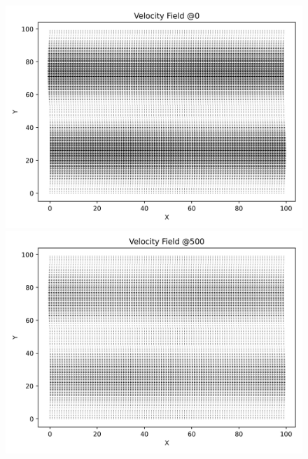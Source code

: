 \begin{figure}[H]
    \begin{minipage}{0.33\textwidth}
        \includegraphics[width=\linewidth]{graphs/ShearWaveDecay/VelocityDistribution/velocity_field_0}
    \end{minipage}%
    \begin{minipage}{0.33\textwidth}
        \includegraphics[width=\linewidth]{graphs/ShearWaveDecay/VelocityDistribution/velocity_field_500}
    \end{minipage}%
    \begin{minipage}{0.33\textwidth}

\end{minipage}
\end{figure}
